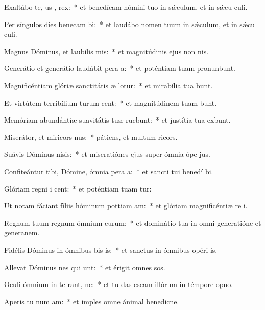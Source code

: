 \item Exaltábo te, us , rex:~* et benedícam nómini tuo in sǽculum, et in sǽcu culi.
\item Per síngulos dies benecam bi:~* et laudábo nomen tuum in sǽculum, et in sǽcu culi.
\item Magnus Dóminus, et laubilis mis:~* et magnitúdinis ejus non  nis.
\item Generátio et generátio laudábit pera a:~* et poténtiam tuam pronunbunt.
\item Magnificéntiam glóriæ sanctitátis æ lotur:~* et mirabília tua bunt.
\item Et virtútem terribílium turum cent:~* et magnitúdinem tuam bunt.
\item Memóriam abundántiæ suavitátis tuæ rucbunt:~* et justítia tua exbunt.
\item Miserátor, et miricors nus:~* pátiens, et multum ricors.
\item Suávis Dóminus nisis:~* et miseratiónes ejus super ómnia ópe jus.
\item Confiteántur tibi, Dómine, ómnia pera a:~* et sancti tui benedí bi.
\item Glóriam regni i cent:~* et poténtiam tuam tur:
\item Ut notam fáciant fíliis hóminum pottiam am:~* et glóriam magnificéntiæ re i.
\item Regnum tuum regnum ómnium curum:~* et dominátio tua in omni generatióne et generanem.
\item Fidélis Dóminus in ómnibus bis is:~* et sanctus in ómnibus opéri is.
\item Allevat Dóminus nes qui unt:~* et érigit omnes sos.
\item Oculi ómnium in te rant, ne:~* et tu das escam illórum in témpore opno.
\item Aperis tu num am:~* et imples omne ánimal benedicne.
